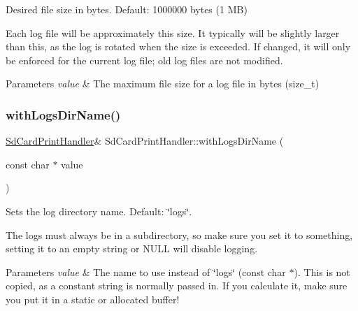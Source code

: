 Desired file size in bytes. Default\+: 1000000 bytes (1 MB) 

Each log file will be approximately this size. It typically will be slightly larger than this, as the log is rotated when the size is exceeded. If changed, it will only be enforced for the current log file; old log files are not modified.


\begin{DoxyParams}{Parameters}
{\em value} & The maximum file size for a log file in bytes (size\+\_\+t) \\
\hline
\end{DoxyParams}
\mbox{\label{class_sd_card_print_handler_aac9a7f9d1a22db39acfc17c4a61c9419}} 
\subsubsection{\texorpdfstring{with\+Logs\+Dir\+Name()}{withLogsDirName()}}
{\footnotesize\ttfamily \mbox{\hyperlink{class_sd_card_print_handler}{Sd\+Card\+Print\+Handler}}\& Sd\+Card\+Print\+Handler\+::with\+Logs\+Dir\+Name (\begin{DoxyParamCaption}\item[{const char $\ast$}]{value }\end{DoxyParamCaption})\hspace{0.3cm}{\ttfamily [inline]}}



Sets the log directory name. Default\+: \char`\"{}logs\char`\"{}. 

The logs must always be in a subdirectory, so make sure you set it to something, setting it to an empty string or N\+U\+LL will disable logging.


\begin{DoxyParams}{Parameters}
{\em value} & The name to use instead of \char`\"{}logs\char`\"{} (const char $\ast$). This is not copied, as a constant string is normally passed in. If you calculate it, make sure you put it in a static or allocated buffer! \\
\hline
\end{DoxyParams}
\mbox{\label{class_sd_card_print_handler_a8b0884db89c62250822641cde11a5abc}} 

